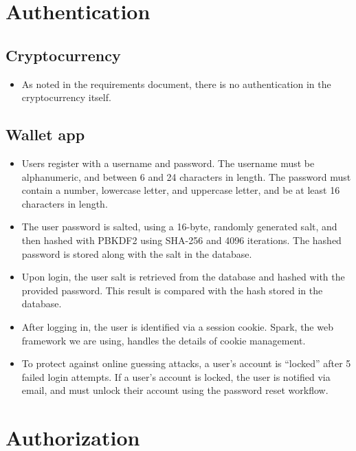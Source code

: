 \documentclass[a4paper,12pt]{article}
\begin{document}
\section{Authentication}

\subsection{Cryptocurrency}

\begin{itemize}
	\item As noted in the requirements document, there is no authentication in the cryptocurrency itself.
\end{itemize}

\subsection{Wallet app}

\begin{itemize}
	\item Users register with a username and password. The username must be alphanumeric, and between 6 and 24 characters in length.
	The password must contain a number, lowercase letter, and uppercase letter, and be at least 16 characters in length.
	\item The user password is salted, using a 16-byte, randomly generated salt, and then hashed with PBKDF2 using SHA-256 and 4096 iterations.
	The hashed password is stored along with the salt in the database.
	\item Upon login, the user salt is retrieved from the database and hashed with the provided password.
	This result is compared with the hash stored in the database.
	\item After logging in, the user is identified via a session cookie.
	Spark, the web framework we are using, handles the details of cookie management. %
	\item To protect against online guessing attacks, a user's account is ``locked'' after 5 failed login attempts.
	If a user's account is locked, the user is notified via email, and must unlock their account using the password reset workflow.
\end{itemize}


\section{Authorization}
\end{document}
